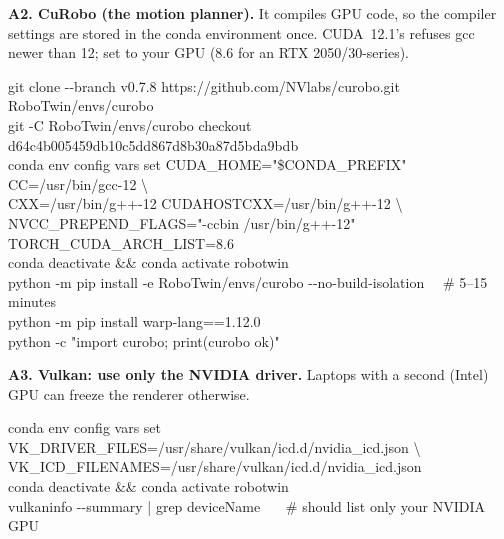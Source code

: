 \documentclass[11pt,a4paper]{article}
\newcommand{\code}[1]{\texttt{\detokenize{#1}}}
\begin{document}
\textbf{A2. CuRobo (the motion planner).} It compiles GPU code, so the compiler settings are stored
in the conda environment once. CUDA~12.1's \code{nvcc} refuses gcc newer than 12; set
\code{TORCH_CUDA_ARCH_LIST} to your GPU (8.6 for an RTX 2050/30-series).
\begin{cmd}
git clone -{}-branch v0.7.8 https://github.com/NVlabs/curobo.git RoboTwin/envs/curobo\\
git -C RoboTwin/envs/curobo checkout d64c4b005459db10c5dd867d8b30a87d5bda9bdb\\
conda env config vars set CUDA\_HOME="\$CONDA\_PREFIX" CC=/usr/bin/gcc-12 \textbackslash\\
\hspace*{1.5em}CXX=/usr/bin/g++-12 CUDAHOSTCXX=/usr/bin/g++-12 \textbackslash\\
\hspace*{1.5em}NVCC\_PREPEND\_FLAGS="-ccbin /usr/bin/g++-12" TORCH\_CUDA\_ARCH\_LIST=8.6\\
conda deactivate \&\& conda activate robotwin\\
python -m pip install -e RoboTwin/envs/curobo -{}-no-build-isolation \ \ \# 5--15 minutes\\
python -m pip install warp-lang==1.12.0\\
python -c "import curobo; print(\textquotesingle{}curobo ok\textquotesingle{})"
\end{cmd}

\textbf{A3. Vulkan: use only the NVIDIA driver.} Laptops with a second (Intel) GPU can freeze the
renderer otherwise.
\begin{cmd}
conda env config vars set VK\_DRIVER\_FILES=/usr/share/vulkan/icd.d/nvidia\_icd.json \textbackslash\\
\hspace*{1.5em}VK\_ICD\_FILENAMES=/usr/share/vulkan/icd.d/nvidia\_icd.json\\
conda deactivate \&\& conda activate robotwin\\
vulkaninfo -{}-summary | grep deviceName \ \ \ \# should list only your NVIDIA GPU
\end{cmd}
\end{document}
